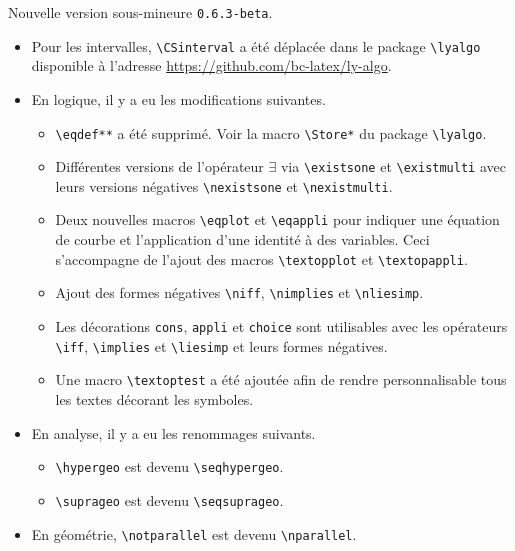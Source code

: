 Nouvelle version sous-mineure \verb+0.6.3-beta+.

\begin{itemize}[itemsep=.5em]
    \item Pour les intervalles, \verb+\CSinterval+ a été déplacée dans le package \verb+\lyalgo+ disponible à l'adresse \url{https://github.com/bc-latex/ly-algo}.


    \item En logique, il y a eu les modifications suivantes.
    \begin{itemize}[itemsep=.5em]
        \item \verb+\eqdef**+ a été supprimé. Voir la macro \verb+\Store*+ du package \verb+\lyalgo+.

        \item Différentes versions de l'opérateur $\exists$ via \verb+\existsone+ et \verb+\existmulti+ avec leurs versions négatives \verb+\nexistsone+ et \verb+\nexistmulti+.

        \item Deux nouvelles macros \verb+\eqplot+ et \verb+\eqappli+ pour indiquer une équation de courbe et l'application d'une identité à des variables. Ceci s'accompagne de l'ajout des macros \verb+\textopplot+ et \verb+\textopappli+.

        \item Ajout des formes négatives \verb+\niff+, \verb+\nimplies+ et \verb+\nliesimp+.

        \item Les décorations \verb+cons+, \verb+appli+ et \verb+choice+ sont utilisables avec les opérateurs \verb+\iff+, \verb+\implies+ et \verb+\liesimp+ et leurs formes négatives.

        \item Une macro \verb+\textoptest+ a été ajoutée afin de rendre personnalisable tous les textes décorant les symboles.
    \end{itemize}


    \item En analyse, il y a eu les renommages suivants.
    \begin{itemize}[itemsep=.5em]
        \item \verb+\hypergeo+ est devenu \verb+\seqhypergeo+.

        \item \verb+\suprageo+ est devenu \verb+\seqsuprageo+.
    \end{itemize}


    \item En géométrie, \verb+\notparallel+ est devenu \verb+\nparallel+.
\end{itemize}

